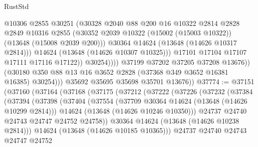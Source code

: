 \begin{lexlean}{RustStd}
\begin{coremodule}
                              @10306
                              @2855
                              @30251
                              (@30328
                                @2040
                                @88
                                @200
                                @16
                                @10322
                                @2814
                                @2828
                                @2849
                                @10316
                                @2855
                                (@30352
                                  @2039
                                  @10322
                                  (@15002 (@15003 @10322))
                                  (@13648 (@15008 @2039 @200)))
                                @30364
                                @14624
                                (@13648 (@14626 @10317 @2814)))
                              @14624
                              (@13648 (@14626 @10307 @10325)))
                            @17101
                            @17104
                            @17107
                            @17111
                            @17116
                            @17122))
                        @30254))))
                @37199
                @37202
                @37205
                @37208
                @13676))
            (@30180 @350 @88 @13 @16 @3652 @2828 (@37368 @349 @3652 @16381 @16385) @30254)))
        @35692
        @35695
        @35698
        @35701
        @13676))
@37774 := @37151
    (@37160
      (@37164
        (@37168
          (@37175
            (@37212
              (@37222
                (@37226
                  (@37232
                    (@37384
                      (@37394
                        (@37398
                          (@37404
                            (@37554
                              (@37709 @30364 @14624 (@13648 (@14626 @10299 @2814)))
                              @14624
                              (@13648 (@14626 @10246 @10350)))
                            @24737
                            @24740
                            @24743
                            @24747
                            @24752
                            @24758))
                        @30364
                        @14624
                        (@13648 (@14626 @10238 @2814)))
                      @14624
                      (@13648 (@14626 @10185 @10365)))
                    @24737
                    @24740
                    @24743
                    @24747
                    @24752

\end{coremodule}
\end{lexlean}

